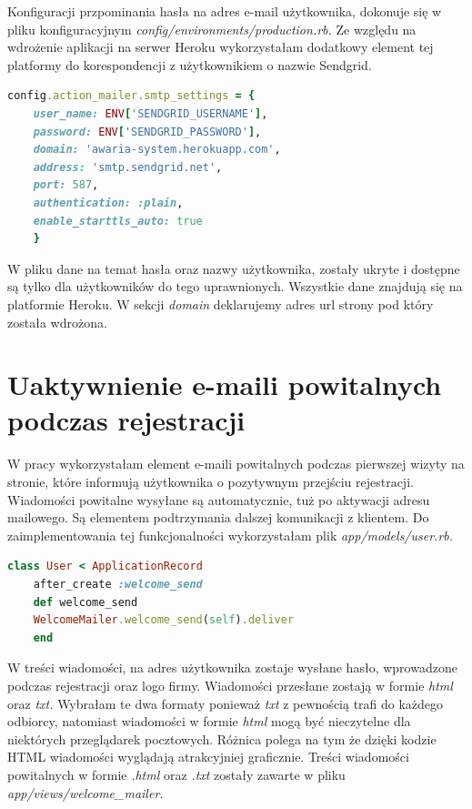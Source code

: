 \documentclass[openright]{xmgr}
\begin{document}
	Konfiguracji przpominania hasła na adres e-mail użytkownika, dokonuje się w pliku konfiguracyjnym \textit{config/environments/production.rb.} Ze względu na wdrożenie aplikacji na serwer Heroku wykorzystałam dodatkowy element tej platformy do korespondencji z użytkownikiem o nazwie Sendgrid.  
	
	\begin{lstlisting}[language=Ruby,lineskip={-1pt},caption=Konfiguracja pliku \textit{production.rb}]
	config.action_mailer.smtp_settings = {
	user_name: ENV['SENDGRID_USERNAME'],
	password: ENV['SENDGRID_PASSWORD'],
	domain: 'awaria-system.herokuapp.com',
	address: 'smtp.sendgrid.net',
	port: 587,
	authentication: :plain,
	enable_starttls_auto: true
	}
	\end{lstlisting}
	
	W pliku dane na temat hasła oraz nazwy użytkownika, zostały ukryte i dostępne są tylko dla użytkowników do tego uprawnionych. Wszystkie dane znajdują się na platformie Heroku. W sekcji \textit{domain} deklarujemy adres url strony pod który została wdrożona.
	\newpage
	\section{Uaktywnienie e-maili powitalnych podczas rejestracji}
	
	W pracy wykorzystałam element e-maili powitalnych podczas pierwszej wizyty na stronie, które informują użytkownika o pozytywnym przejściu rejestracji. Wiadomości powitalne wysyłane są automatycznie, tuż po aktywacji adresu mailowego. Są elementem podtrzymania dalszej komunikacji z klientem. Do zaimplementowania tej funkcjonalności wykorzystałam plik \textit{app/models/user.rb.} 
	
	\begin{lstlisting}[language=Ruby,lineskip={-1pt},caption=Kod odpowiedzialny za wysyłanie e-mail powitalnych]
	class User < ApplicationRecord
	after_create :welcome_send
	def welcome_send
	WelcomeMailer.welcome_send(self).deliver
	end
	\end{lstlisting}
	
	W treści wiadomości, na adres użytkownika zostaje wysłane hasło, wprowadzone podczas rejestracji oraz logo firmy. Wiadomości przesłane zostają w formie \textit{html} oraz \textit{txt.} Wybrałam te dwa formaty ponieważ \textit{txt} z pewnością trafi do każdego odbiorcy, natomiast wiadomości w formie \textit{html} mogą być nieczytelne dla niektórych przeglądarek pocztowych. Różnica polega na tym że dzięki kodzie HTML wiadomości wyglądają atrakcyjniej graficznie.
	Treści wiadomości powitalnych w formie \textit{.html} oraz \textit{.txt} zostały zawarte w pliku \textit{app/views/welcome\_mailer.}
	
\end{document}
